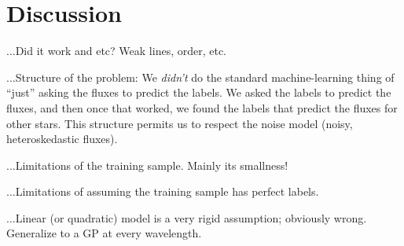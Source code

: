 \documentclass[12pt, preprint]{aastex}
\newcommand{\teff}{\mbox{$\rm T_{eff}$}}
\newcommand{\feh}{\mbox{$\rm [Fe/H]$}}
\newcommand{\logg}{\mbox{$\rm \log g$}}
\begin{document}
%
%
%
%
%
%
%


\section{Discussion}

...Did it work and etc?  Weak lines, order, etc.

...Structure of the problem:
We \emph{didn't} do the standard machine-learning thing of ``just'' asking the fluxes to predict the labels.
We asked the labels to predict the fluxes, and then once that worked, we found the labels that predict the fluxes for other stars.
This structure permits us to respect the noise model (noisy, heteroskedastic fluxes).

...Limitations of the training sample.  Mainly its smallness!

...Limitations of assuming the training sample has perfect labels.

...Linear (or quadratic) model is a very rigid assumption; obviously wrong.
Generalize to a GP at every wavelength.
\end{document}

